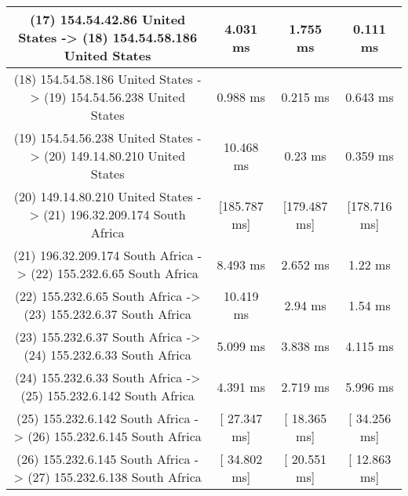 \begin{table}[]
\begin{tabular}{ | c | c | c | c | }
(17) 154.54.42.86    United States   -> (18) 154.54.58.186   United States & 	     4.031 ms   	&     1.755 ms   	 &    0.111 ms   \\ \hline
(18) 154.54.58.186   United States   -> (19) 154.54.56.238   United States & 	     0.988 ms   	&     0.215 ms   	 &    0.643 ms   \\ \hline
(19) 154.54.56.238   United States   -> (20) 149.14.80.210   United States & 	    10.468 ms   	&      0.23 ms   	 &    0.359 ms   \\ \hline
(20) 149.14.80.210   United States   -> (21) 196.32.209.174  South Africa  & 	  [185.787 ms]  	&  [179.487 ms]  	 & [178.716 ms]  \\ \hline
(21) 196.32.209.174  South Africa    -> (22) 155.232.6.65    South Africa  & 	     8.493 ms   	&     2.652 ms   	 &     1.22 ms   \\ \hline
(22) 155.232.6.65    South Africa    -> (23) 155.232.6.37    South Africa  & 	    10.419 ms   	&      2.94 ms   	 &     1.54 ms   \\ \hline
(23) 155.232.6.37    South Africa    -> (24) 155.232.6.33    South Africa  & 	     5.099 ms   	&     3.838 ms   	 &    4.115 ms   \\ \hline
(24) 155.232.6.33    South Africa    -> (25) 155.232.6.142   South Africa  & 	     4.391 ms   	&     2.719 ms   	 &    5.996 ms   \\ \hline
(25) 155.232.6.142   South Africa    -> (26) 155.232.6.145   South Africa  & 	  [ 27.347 ms]  	&  [ 18.365 ms]  	 & [ 34.256 ms]  \\ \hline
(26) 155.232.6.145   South Africa    -> (27) 155.232.6.138   South Africa  & 	  [ 34.802 ms]  	&  [ 20.551 ms]  	 & [ 12.863 ms]  \\ \hline
\end{tabular}
\end{table}
